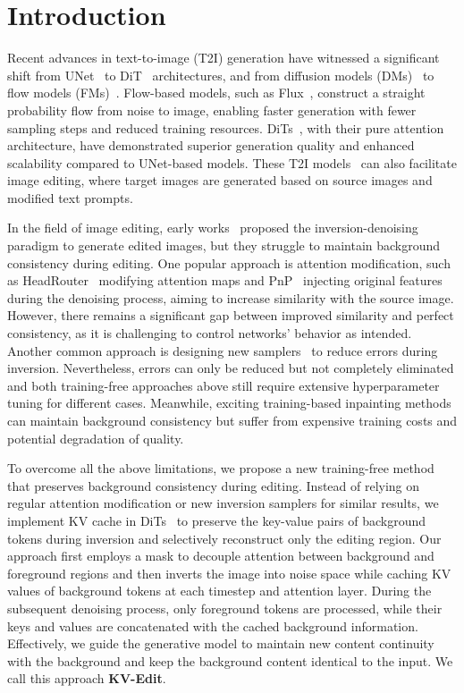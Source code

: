 \section{Introduction}
\label{sec:intro}

Recent advances in text-to-image (T2I) generation have witnessed a significant shift from UNet~\cite{ronneberger2015u} to DiT~\cite{peebles2023scalable} architectures, and from diffusion models (DMs)~\cite{tang2024post,wang2024towards,dai2024motionlcm} to flow models (FMs)~\cite{flux,kulikov2024flowedit,zhu2024flowie}. Flow-based models, such as Flux~\cite{flux}, construct a straight probability flow from noise to image, enabling faster generation with fewer sampling steps and reduced training resources. DiTs~\cite{peebles2023scalable}, with their pure attention architecture, have demonstrated superior generation quality and enhanced scalability compared to UNet-based models. These T2I models~\cite{rombach2022high,flux,esser2024scaling} can also facilitate image editing, where target images are generated based on source images and modified text prompts.

In the field of image editing, early works~\cite{sdedit,hertz2022prompt,tumanyan2023plug,dong2023prompt} proposed the inversion-denoising paradigm to generate edited images, but they struggle to maintain background consistency during editing. One popular approach is attention modification, such as HeadRouter~\cite{xu2024headrouter} modifying attention maps and PnP~\cite{tumanyan2023plug} injecting original features during the denoising process, aiming to increase similarity with the source image. However, there remains a significant gap between improved similarity and perfect consistency, as it is challenging to control networks' behavior as intended. Another common approach is designing new samplers~\cite{miyake2023negative,mokady2023null} to reduce errors during inversion. Nevertheless, errors can only be reduced but not completely eliminated and both training-free approaches above still require extensive hyperparameter tuning for different cases. Meanwhile, exciting training-based inpainting methods~\cite{li2024brushedit,zhuang2024task} can maintain background consistency but suffer from expensive training costs and potential degradation of quality.

To overcome all the above limitations, we propose a new training-free method that preserves background consistency during editing. Instead of relying on regular attention modification or new inversion samplers for similar results, we implement KV cache in DiTs~\cite{peebles2023scalable} to preserve the key-value pairs of background tokens during inversion and selectively reconstruct only the editing region. Our approach first employs a mask to decouple attention between background and foreground regions and then inverts the image into noise space while caching KV values of background tokens at each timestep and attention layer. During the subsequent denoising process, only foreground tokens are processed, while their keys and values are concatenated with the cached background information. Effectively, we guide the generative model to maintain new content continuity with the background and keep the background content identical to the input. We call this approach \textbf{KV-Edit}.


